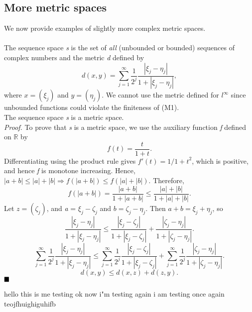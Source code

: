 \documentclass[11pt]{article}
\begin{document}
\subsection{More metric spaces}
We now provide examples of slightly more complex metric spaces.
\\\\
\noindent
{}
The sequence space \textit{s} is the set of \textit{all} (unbounded or bounded) sequences of complex numbers and the metric \textit{d} defined by
$$d(x, y) = \sum_{j=1}^\infty \frac{1}{2^j}\frac{|\xi_j - \eta_j|}{1 + |\xi_j - \eta_j|},$$
where $x = (\xi_j)$ and $y = (\eta_j)$. We cannot use the metric defined for $l^\infty$ since unbounded functions could violate the finiteness of (M1).
\\
 The sequence space \textit{s} is a metric space. 
\\\textit{Proof.}
To prove that \textit{s} is a metric space, we use the auxiliary function \textit{f} defined on $\mathbb{R}$ by
$$ f(t) = \frac{t}{1+t}.$$
Differentiating using the product rule gives $f'(t) = 1/{1+t}^2$, which is positive, and hence \textit{f} is monotone increasing. Hence, $|a + b| \leq |a| + |b| \Rightarrow f(|a+b|) \leq f(|a| + |b|).$ Therefore,
$$ f(|a + b|) = \frac{|a+b|}{1 + |a+b|} \leq \frac{|a| +|b|}{1 + |a| + |b|}.$$
Let $z = (\zeta_j)$, and \textit{a} = $\xi_j - \zeta_j$ and $\textit{b} = \zeta_j - \eta_j$. Then $a + b = \xi_j + \eta_j$, so 
$$\frac{|\xi_j - \eta_j|}{1 +|\xi_j - \eta_j|} \leq \frac{|\xi_j - \zeta_j|}{1+ |\xi_j - \zeta_j|} + \frac{|\zeta_j - \eta_j|}{1+|\zeta_j - \eta_j|}.$$
$$\sum_{j=1}^{\infty}\frac{1}{2^j}\frac{|\xi_j - \eta_j|}{1 +|\xi_j - \eta_j|} \leq \sum_{j=1}^{\infty}\frac{1}{2^j}\frac{|\xi_j - \zeta_j|}{1+ |\xi_j - \zeta_j|} + \sum_{j=1}^{\infty}\frac{1}{2^j}\frac{|\zeta_j - \eta_j|}{1+|\zeta_j - \eta_j|}.$$
$$d(x,y) \leq d(x, z) + d(z, y).$$ $\hfill \blacksquare$

hello this is me testing
ok now i"m testing again
i am testing once again
teojfhuighiguhifb
\end{document}
